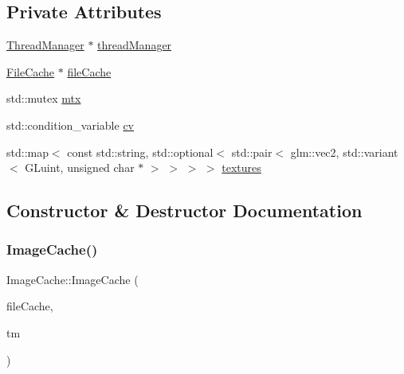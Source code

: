 \subsection*{Private Attributes}
\begin{DoxyCompactItemize}
\item 
\mbox{\hyperlink{classsage_1_1ThreadManager}{Thread\+Manager}} $\ast$ \mbox{\hyperlink{classsage_1_1ImageCache_a114e9da7a04c34fa4521c8421729e60a}{thread\+Manager}}
\item 
\mbox{\hyperlink{classsage_1_1FileCache}{File\+Cache}} $\ast$ \mbox{\hyperlink{classsage_1_1ImageCache_a6b667c59600e85d741c19abd1c56b37c}{file\+Cache}}
\item 
std\+::mutex \mbox{\hyperlink{classsage_1_1ImageCache_a1f00cfa79cf2a5dc7364905b0e0ec79e}{mtx}}
\item 
std\+::condition\+\_\+variable \mbox{\hyperlink{classsage_1_1ImageCache_ade561f2902ee4d3c6c4d5cf5c1202846}{cv}}
\item 
std\+::map$<$ const std\+::string, std\+::optional$<$ std\+::pair$<$ glm\+::vec2, std\+::variant$<$ G\+Luint, unsigned char $\ast$ $>$ $>$ $>$ $>$ \mbox{\hyperlink{classsage_1_1ImageCache_a01b8aa5587b2cf9c5e1f1059431f0118}{textures}}
\end{DoxyCompactItemize}


\subsection{Constructor \& Destructor Documentation}
\mbox{\label{classsage_1_1ImageCache_aa6334522810673df149a290bfbf9da3d}} 
\subsubsection{\texorpdfstring{ImageCache()}{ImageCache()}}
{\footnotesize\ttfamily Image\+Cache\+::\+Image\+Cache (\begin{DoxyParamCaption}\item[{\mbox{\hyperlink{classsage_1_1FileCache}{File\+Cache}} $\ast$}]{file\+Cache,  }\item[{\mbox{\hyperlink{classsage_1_1ThreadManager}{Thread\+Manager}} $\ast$}]{tm }\end{DoxyParamCaption})}

\mbox{\label{classsage_1_1ImageCache_a48e8f9fc5513ee195d209cbec596c093}} 
